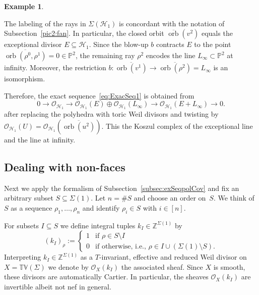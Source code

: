 \documentclass[11pt]{article}
\theoremstyle{definition}
\newtheorem{exam}[theo]{Example}
\numberwithin{equation}{section}
\DeclareMathOperator{\orb}{orb}
\newcommand{\PP}{\mathbb P}
\newcommand{\T}{\mathbb T}
\newcommand{\V}{\mathbb V}
\newcommand{\Z}{\mathbb Z}
\newcommand{\CH}{{\mathcal H}}
\newcommand{\CO}{{\mathcal O}}
\newcommand{\toric}{\T\V}
\newcommand{\ko}{\overline}
\newcommand{\kU}{U}
\renewcommand{\sharp}{\#}
\newcommand{\ssect}[1]{Subsection~\ref{#1}}
\begin{document}
\begin{exam}
{\begin{figure}[ht]
\newcommand{\spaceA}{\hspace*{3.5em}}
\newcommand{\scaleA}{0.8}
\spaceA
{}
\spaceA
{}
\caption{\;}
\label{fig:fanH1}
\end{figure}

The labeling of the rays in $\Sigma(\CH_1)$ is concordant 
with the notation of \ssect{pic2:fan}. In particular, the closed orbit
$\ko{\orb}(v^2)$ equals the exceptional divisor $E\subseteq\CH_1$.
Since the blow-up $b$ contracts $E$ to 
the point $\ko{\orb(\rho^0,\rho^1)}=0\in\PP^2$, the remaining ray
$\rho^2$ encodes the line $L_\infty\subset\PP^2$ at infinity.
Moreover, the restriction 
$b:\ko{\orb(v^1)}\to\ko{\orb(\rho^2)}=L_{\infty}$ is an isomorphism.

Therefore, the exact sequence~\eqref{eq:ExacSeq1} is obtained from 
$$
0\to \CO_{\CH_1} \to \CO_{\CH_1}(E)\oplus
\CO_{\CH_1}(L_\infty)\to\CO_{\CH_1}(E+L_\infty)\to 0.
$$
after replacing the polyhedra with toric Weil divisors and twisting 
by $\CO_{\CH_1}(\kU)=\CO_{\CH_1}(\ko{\orb(u^2)})$. This the 
Koszul complex of the exceptional line and the line at infinity.
}
\end{exam}

\subsection{Dealing with non-faces}
\label{subsec:pc}
Next we {apply the formalism of 
Subsection~\ref{subsec:exSeqpolCov} and} 
fix an arbitrary subset $S\subseteq\Sigma(1)$. 
Let $n=\sharp S$ {and choose} an order
on~$S$. {We think} of $S$ as a sequence
$\rho_1,\ldots,\rho_n$ and identify $\rho_i\in S$ 
with $i\in[n]$.

For subsets $I\subseteq S$ we define integral
tuples $k_I\in\Z^{\Sigma(1)}$ by
$$
(k_I)_\rho:=\left\{
\begin{array}{ll}
1 & \mbox{if } \rho\in S\setminus I\\
0 & \mbox{if otherwise, i.e., }\rho\in I\cup 
(\Sigma(1)\setminus S).
\end{array}\right.
$$
Interpreting $k_I\in\Z^{\Sigma(1)}$ as a
$T$-invariant, effective and reduced Weil divisor 
on $X=\toric(\Sigma)$ we denote by $\CO_X(k_I)$ 
the associated sheaf. Since $X$ is smooth, these 
divisors are automatically Cartier. In particular,
the sheaves $\CO_X(k_I)$ are invertible albeit not
nef in general.
\end{document}
